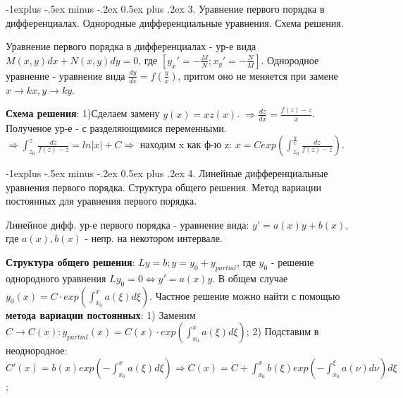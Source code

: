 \documentclass[unicode,10pt, landscape]{article}
\makeatletter
\renewcommand{\subsection}{\@startsection{subsection}{2}{0mm}%
                                {-1explus -.5ex minus -.2ex}%
                                {0.5ex plus .2ex}%
                                {\normalfont\normalsize\bfseries}}
\makeatother
\begin{document}

\subsection{3. Уравнение первого порядка в дифференциалах. Однородные дифференциальные уравнения. Схема решения.}
\begin{Def}
Уравнение первого порядка в дифференциалах - ур-е вида $M(x,y)dx + N(x,y)dy = 0$, где $[y_x' = -\frac{M}{N}; x_y' = -\frac{N}{M}]$.
Однородное уравнение - уравнение вида $\frac{dy}{dx} = f(\frac{y}{x})$, притом оно не меняется при замене $x \to kx, y \to ky$.
\end{Def}
 {\bf Схема решения}:
1)Сделаем замену $y(x) = xz(x)$. $\Rightarrow \frac{dz}{dx} = \frac{f(z) - z}{x}$. Полученое ур-е - с разделяющимися переменными. $\Rightarrow \int_{z_0}^z\frac{dz}{f(z) - z} = ln|x| + C \Rightarrow $ находим x как ф-ю z: $x = Cexp(\int_{z_0}^\frac{y}{x}\frac{dz}{f(z)-z})$.


\subsection{4. Линейные дифференциальные уравнения первого порядка. Структура общего решения. Метод вариации постоянных для уравнения первого порядка.}
\begin{Def}
Линейное дифф. ур-е первого порядка - уравнение вида: $y' = a(x)y + b(x)$, где $a(x), b(x)$ - непр. на некотором интервале.
\end{Def}
{\bf Структура общего решения}: $Ly = b; y = y_0 + y_{partial}$, где $y_0$ - решение однородного уравнения $Ly_0 = 0 \Leftrightarrow y' = a(x)y$. В общем случае $y_0(x) = C\cdot exp(\int_{x_0}^xa(\xi)d\xi)$. Частное решение можно найти с помощью {\bf метода вариации постоянных}: 1) Заменим $C \to C(x): y_{partial}(x) = C(x)\cdot exp(\int_{x_0}^xa(\xi)d\xi)$; 2) Подставим в неоднородное: $C'(x) = b(x)exp(-\int_{x_0}^x a(\xi)d\xi) \Rightarrow C(x) = C + \int_{x_0}^{x} b(\xi)exp(-\int_{x_0}^\xi a(\nu)d\nu)d\xi$;

\end{document}
